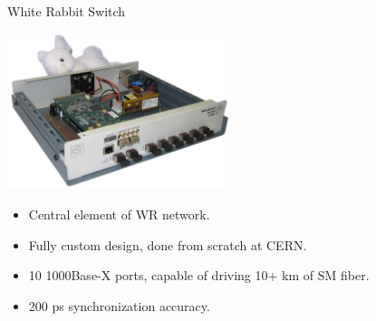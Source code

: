 \documentclass[compress,red]{beamer}
\begin{document}


\begin{frame}{White Rabbit Switch}
\begin{center}
\includegraphics[width=6.5cm]{wrs_photo.jpg}
\end{center}
\begin{itemize}
\item Central element of WR network.
\item Fully custom design, done from scratch at CERN.
\item 10 1000Base-X ports, capable of driving 10+ km of SM fiber.
\item 200 ps synchronization accuracy.
\end{itemize}
\end{frame}
\end{document}
